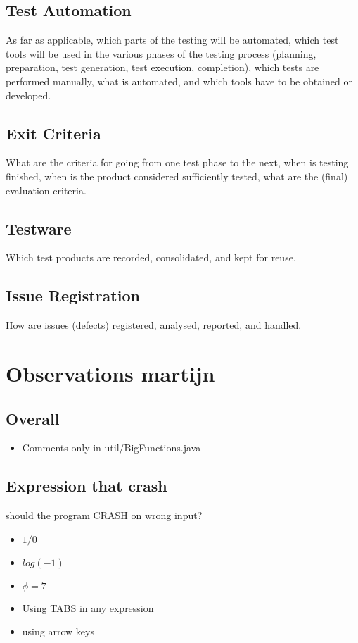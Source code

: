\documentclass[11pt,a4paper]{article}
\begin{document}
\subsection{Test Automation}
\label{sec:orgheadline28}
As far as applicable, which parts of the testing will be automated, which test tools will be
used in the various phases of the testing process (planning, preparation, test generation, test
execution, completion), which tests are performed manually, what is automated, and which
tools have to be obtained or developed.
\subsection{Exit Criteria}
\label{sec:orgheadline29}
What are the criteria for going from one test phase to the next, when is testing finished,
when is the product considered sufficiently tested, what are the (final) evaluation criteria.
\subsection{Testware}
\label{sec:orgheadline30}
Which test products are recorded, consolidated, and kept for reuse.
\subsection{Issue Registration}
\label{sec:orgheadline31}
How are issues (defects) registered, analysed, reported, and handled.

\section{Observations martijn}
\label{sec:orgheadline37}
\subsection{Overall}
\label{sec:orgheadline33}
\begin{itemize}
\item Comments only in util/BigFunctions.java
\end{itemize}
\subsection{Expression that crash}
\label{sec:orgheadline34}
should the program CRASH on wrong input?
\begin{itemize}
\item \(1/0\)
\item \(log(-1)\)
\item \(\phi = 7\)
\item Using TABS in any expression
\item using arrow keys
\end{itemize}
\end{document}
